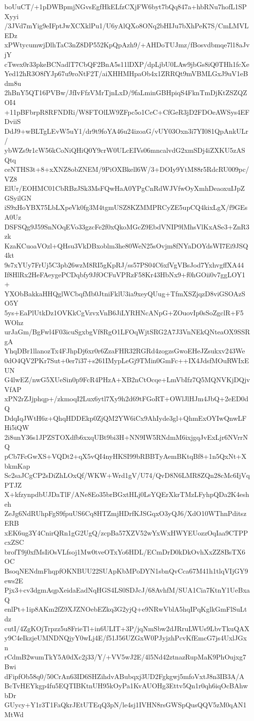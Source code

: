 boUuCT/+1pDWBpmjNGvsEgfHkELfzCXjFW6byt7bQq847a+hbRNu7hofL1SPXyyi
/3JVd7mYig9eIFptJwXCXklPu1/U6yAlQXo8ONq2bHIJu7bXhPeK7S/CmLMVLEDz
xPWtycumwjDlhTaC3nZ8DP552KpQpAzh9/+AHDoTUJmz/fBosvdbmqe7l18aJvjY
cTwex0r33pkeBCNadlT7CbQF2BnA5s11lDXP/dpLjbU0LAw9jbGs8iQ0THh1fcXe
Yed12hR3O8fYJp67u9roNtF2T/aiXHHMHpaOb4x1ZRRQt9mVBMLGxJ9uV1eBdm8u
2hBnY5QT16PVBw/JfIvFfzVMrTjnLxD/9faLminGBHpiqS4FknTmDjKtZSZQZOI4
+11pBFbrpR8RFNDRi/W8FTOlLW9ZFpc5o1CeC+CfGeR3jD2FDOeAWSys4EFDviiS
DdJ9+wBLTgLEvW5uY1/dr9t9foYA46u24izoaG/vUY03Oxn3i7YI081QpAnkULr/
ybWZs9r1cW56kCoNiQHiQ0Y9crW0ULcEIVs06mncalvdG2xmSDj4iZXKU5zASQtq
ceNTHS3t+8+xXNZ8obZNEM/9PiOXBkell6W/3+DOIy9YtM88r5RdcRU009pc/VZ8
ElUr/EOHMC01CbRBzJSk3MsFQwHaA0YPgCnRdWJVfwOyXmhDeaoxuIJpZGSyilGN
iS9xHoYBX75LbLXpeVk0fg3M4tgmUSZ8KZMMPRCyZE5upCQ4kixLgX/f9GEsA0Uz
DSFSQg9J59SnNOqEVo33gzcFe2f0xQkoMGcZ9EbdVNIP9lMhsVlKxASe3+ZnR3zk
KzaKCuoaVOzl+QHsu3VkDBxoblm3he80WeN25sOvjm8fNYaDOYdsWI7Ei9JSQ4kt
9s7xYUy7FrUj5C3pb26wzM8RI5gKpRJ/ss57PS04C6xfVgVBsJod7YxhvgffXA44
If8HlRx2HeFAeygePCDqbfy9JfOCFuVPRzF58Kr43HbNx9+f0hGOii0v7ggLOY1+
YXObBakkaHHQglWCbqfMb0JtniFklU3ia9xeyQUug+TfmXSZjqzD8viGSOAzSO5Y
5ys+EaPlUtkDz1OVKkCgVzvxVnB6JiLYRHNcANpG+ZOuovIp0sSoZgclR+F5WOhz
urJaGm/BgFwl4F03icuSgxbgVf8RgO1LFOqWjtSRG2A7J3VnNEkQNteaOX9SSRgA
YhqDBr1llanozTx4FJhpDj6xr0r6ZzaFHR32RGRd4zogzsGwoEHeJZsukxv243We
0dO4QV2PKr7Sut+0er7i37+s261IMypLeGj9TMin0GmFc++IX4JdsfMOuRWIxEUN
G4lwEZ/nwG5XUeSin0p9FcR4PHzA+XB2nCtOcqe+LmVbIfz7Q5MQNVKjDQjvVfAP
xPN2rZJjphqp+/zkmoqI2Lux6ytl7Xy9h2d69tFGoRT+OWlJlHJm4JbQ+2eED0dQ
DdqIqJWtH6z+QhqHDDEkp0ZjQM2YW6iCx9AhIyde3gl+QhmExOYIwQnwLFHi5iQW
2i8unY36s1JPZSTOXdfb6xxqUBt9bi3H+NN9IW5RNdmM6ixjgqJvExLjr6NVrrNQ
pCb7FcGwXS+VQDt2+qX5vQI4nyHKSI99bRBBTyAemBKtqBf8+1n5QxNt+XbkmKap
Sc2saJCgCP2sDiZhLOxQf/WKW+Wrd1gV/U74/QvD8N6LMR8ZQn28cMc6IjVqPTJZ
X+kfzynpdbUJDaTlF/ANe8Eo35brBGxtHLj0LsYQErXkrTMzLFyhpQDa2K4esheh
ZeJg6NdRUhpFgS9fpuUS6Cq8HTZmjHDrfKJSGqxO3yQJ6/XdO10WThnPditszERB
xEK6ug3Y4CnirQRn1gG2UgQ/zcpBa57XZV52wYxWxHWYEUozzOqIaa9CTPPcxZSC
brofT9j0xfMsIiOsVLfsoj1Mw0tveOTxYo6HDL/ECmDrD0kDkOvhXxZZ8BsTX6OC
BsoqNENdmFhqpfOKNBUU22SUApKbMPoDYN1sbnQvCca67M41h1tlqVIjGY9ews2E
Pjx3+cv3dgmAqpXeidaEadNqHGS4LS0SDJcJ/68AvhfM/SUA1Cia7KtnY1UeBxaQ
enlPt+1ip8AKm2fZ9XJZNOebEZkq3G2yjQ+e9NRwVblA5hqIPqKglkGmFlSuLtdz
cutI/4ZgKOjTrpzz5u8FrieTl+in6ULIT+3P/jqNmSbw2dJRruLWUs9LbvTkuQAX
y9C4eIkzjeUMNDNQjyY0wLj4E/f51J56UZGxW0PJyjzhPcvKfEmcG7js4UxlJGxn
rCdmB2wumTkY5A0dXc2j33/Y/+VV5wJ2E/4l5Nd42ztnazRupMaK9PhOujxg7Bwi
dFipfOb58q0/50CrAn63ID6SHZihdvABubqxj3UD2Fgkgwj5mfoVxtJ8n3IB3A/A
BcTvHEYkgp4fu5EQTIBKtnUH95kOyPa1KvAUOHg3Ettv5Qn1r0qh6iqOcBAhwbDr
GUycy+Y1r3T1FaQkrJEtUTEqQ3pN/le4sj1IVHN8rsGWSpQusQQV5zM0qAN1MtWd
